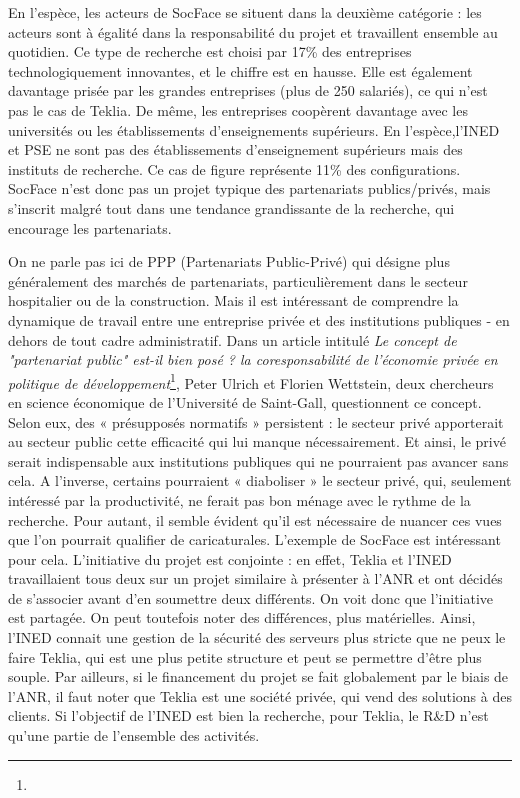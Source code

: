 En l’espèce, les acteurs de SocFace se situent dans la deuxième catégorie : les acteurs sont à égalité dans la responsabilité du projet et travaillent ensemble au quotidien. Ce type de recherche est choisi par 17\% des entreprises technologiquement innovantes, et le chiffre est en hausse. Elle est également davantage prisée par les grandes entreprises (plus de 250 salariés), ce qui n’est pas le cas de Teklia. De même, les entreprises coopèrent davantage avec les universités ou les établissements d’enseignements supérieurs. En l’espèce,l’\gls{INED} et \gls{PSE} ne sont pas des établissements d'enseignement supérieurs mais des instituts de recherche. Ce cas de figure représente 11\% des configurations. SocFace n’est donc pas un projet typique des partenariats publics/privés, mais s’inscrit malgré tout dans une tendance grandissante de la recherche, qui encourage les partenariats.

On ne parle pas ici de PPP (Partenariats Public-Privé) qui désigne plus généralement des marchés de partenariats, particulièrement dans le secteur hospitalier ou de la construction. Mais il est intéressant de comprendre la dynamique de travail entre une entreprise privée et des institutions publiques - en dehors de tout cadre administratif. Dans un article intitulé \textit{Le concept de "partenariat public" est-il bien posé ? la coresponsabilité de l’économie privée en politique de développement}\footnote{}, Peter Ulrich et Florien Wettstein, deux chercheurs en science économique de l’Université de Saint-Gall, questionnent ce concept. Selon eux, des « présupposés normatifs » persistent : le secteur privé apporterait au secteur public cette efficacité qui lui manque nécessairement. Et ainsi, le privé serait indispensable aux institutions publiques qui ne pourraient pas avancer sans cela. A l’inverse, certains pourraient « diaboliser » le secteur privé, qui, seulement intéressé par la productivité, ne ferait pas bon ménage avec le rythme de la recherche. Pour autant, il semble évident qu’il est nécessaire de nuancer ces vues que l’on pourrait qualifier de caricaturales. L’exemple de SocFace est intéressant pour cela. L’initiative du projet est conjointe : en effet, Teklia et l’\gls{INED} travaillaient tous deux sur un projet similaire à présenter à l’ANR et ont décidés de s’associer avant d’en soumettre deux différents. On voit donc que l’initiative est partagée. 
On peut toutefois noter des différences, plus matérielles. Ainsi, l’\gls{INED} connait une gestion de la sécurité des serveurs plus stricte que ne peux le faire Teklia, qui est une plus petite structure et peut se permettre d’être plus souple. Par ailleurs, si le financement du projet se fait globalement par le biais de l’ANR, il faut noter que Teklia est une société privée, qui vend des solutions à des clients. Si l’objectif de l’\gls{INED} est bien la recherche, pour Teklia, le R\&D n’est qu’une partie de l’ensemble des activités.\\

